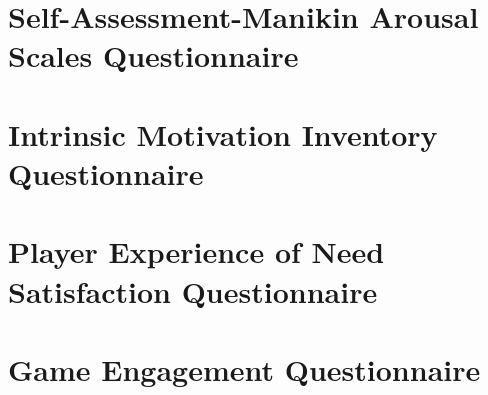 \documentclass{uofsthesis-cs}
\begin{document}
\chapter{Self-Assessment-Manikin Arousal Scales Questionnaire}            \label{app:q-sam}         \noindent{}
\chapter{Intrinsic Motivation Inventory Questionnaire}                    \label{app:q-ini}         \noindent{}
\chapter{Player Experience of Need Satisfaction Questionnaire}            \label{app:q-pens}        \noindent{}
\chapter{Game Engagement Questionnaire}                                   \label{app:q-geq}         \noindent{}

\end{document}
